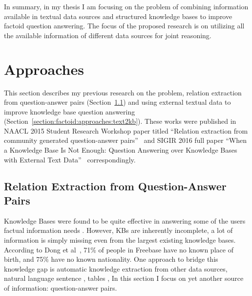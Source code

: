 In summary, in my thesis I am focusing on the problem of combining information available in textual data sources and structured knowledge bases to improve factoid question answering.
The focus of the proposed research is on utilizing all the available information of different data sources for joint reasoning.

\section{Approaches}
\label{section:factoid:approaches}

This section describes my previous research on the problem, \ie relation extraction from question-answer pairs (Section~\ref{section:factoid:approaches:cqarelextract}) and using external textual data to improve knowledge base question answering (Section~\ref{section:factoid:approaches:text2kb}).
These works were published in NAACL 2015 Student Research Workshop paper titled ``Relation extraction from community generated question-answer pairs''~\cite{savenkov2015relation} and SIGIR 2016 full paper ``When a Knowledge Base Is Not Enough: Question Answering over Knowledge Bases with External Text Data''~\cite{Savenkov:2016:KBE:2911451.2911536} correspondingly.


\subsection{Relation Extraction from Question-Answer Pairs}
\label{section:factoid:approaches:cqarelextract}

Knowledge Bases were found to be quite effective in answering some of the users factual information needs \cite{unger2014introduction}.
However, KBs are inherently incomplete, \ie a lot of information is simply missing even from the largest existing knowledge bases.
According to Dong et al~\cite{Dong:2014:KVW:2623330.2623623}, 71\% of people in
Freebase have no known place of birth, and 75\% have no known nationality.
One approach to bridge this knowledge gap is automatic knowledge extraction from other data sources, \eg natural language sentence \cite{Agichtein:2000:SER:336597.336644,Gupta:2014:BOS:2732286.2732288,jijkoun2004information,MintzBSJ09}, tables \cite{Cafarella:2008:WEP:1453856.1453916}, \etc
In this section I focus on yet another source of information: question-answer pairs.

